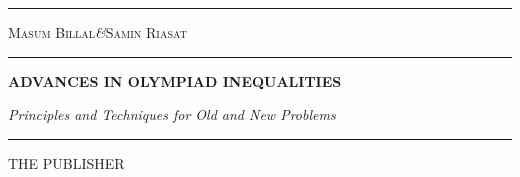 \documentclass[a4paper, 12pt, leqno,fleq]{extbook}
\theoremstyle{definition}
\numberwithin{problem}{chapter}
\begin{document}
	\frontmatter
	\begin{titlepage}
		\txtheight
		\begin{minipage}[t]{0.05\txtwidth}
			\color{rosewood}
			\rule{6pt}{\txtheight}
		\end{minipage}
		\hspace{0.05\txtwidth}
		\begin{minipage}[t]{2\txtwidth}
			\color{smokyblack}
			\vspace*{\drop}
			{\Large\scshape Masum Billal\quad\textit{\&}\quad Samin Riasat} \\
			\rule{1\txtwidth}{1pt} \par
			\vspace{3\baselineskip}
			{\noindent\bfseries ADVANCES IN OLYMPIAD INEQUALITIES} \par
			\vspace{2\baselineskip}
			{\large\itshape Principles and Techniques for Old and New Problems} \par
			\vspace{6.5\baselineskip}
			{\scshape } \par
			\vspace{0.1\baselineskip}
			{\Large } \par
			\vspace{\baselineskip}
			\rule{\txtwidth}{1pt} \par
			\vspace{\baselineskip}
			{\Large THE PUBLISHER}
		\end{minipage}
		\hfill
	\end{titlepage}
		
\end{document}

